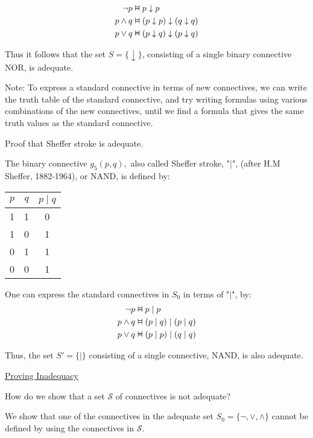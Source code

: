 \documentclass{article}
\newcommand{\vDashv}{%
  \mathrel{%
    \text{%
      \ooalign{$\vDash$\cr\reflectbox{$\vDash$}\cr}%
    }%
  }%
}
\begin{document}
\begin{align*}
\neg p &\vDashv p \downarrow p \\
p \wedge q &\vDashv (p \downarrow p) \downarrow (q \downarrow q) \\
p \vee q &\vDashv (p \downarrow q) \downarrow (p \downarrow q)
\end{align*}

Thus it follows that the set $S = \{\downarrow\}$, consisting of a single binary connective NOR, is adequate.

Note: To express a standard connective in terms of new connectives, we can write the truth table of the standard connective, and try writing formulas using various combinations of the new connectives, until we find a formula that gives the same truth values as the standard connective.


Proof that Sheffer stroke is adequate.

The binary connective $g_5(p,q),$ also called Sheffer stroke, "$\mid$", (after H.M Sheffer, 1882-1964), or NAND, is defined by:


\begin{table}[h]
    \centering
    \begin{tabular}{|c|c|c|}\hline
        $p$ & $q$ & $p\mid q$\\ \hline
         1& 1 &0 \\
         1& 0 &1 \\
         0&  1& 1\\
         0&  0& 1\\\hline
    \end{tabular}
\end{table}


One can express the standard connectives in $S_0$ in terms of "$\mid$", by:
\begin{align*}
\neg p &\vDashv p \mid p \\
p \wedge q &\vDashv (p \mid q) \mid (p \mid q) \\
p \vee q &\vDashv (p \mid p) \mid (q \mid q)
\end{align*}

Thus, the set $S' = \{\mid\}$ consisting of a single connective, NAND, is also adequate. 


\underline{Proving Inadequacy}

How do we show that a set $\mathcal{S}$ of connectives is not adequate?

We show that one of the connectives in the adequate set $S_0 = \{\neg, \vee, \wedge\}$ cannot be defined by using the connectives in $\mathcal{S}$. 
\end{document}
